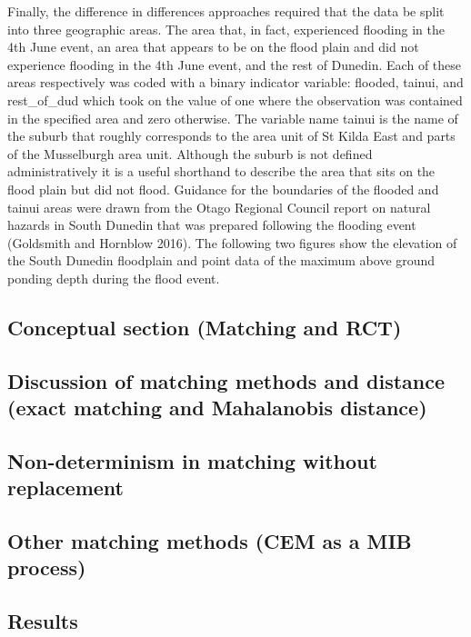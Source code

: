 \documentclass[]{article}
\begin{document}
Finally, the difference in differences approaches required that the data
be split into three geographic areas. The area that, in fact,
experienced flooding in the 4th June event, an area that appears to be
on the flood plain and did not experience flooding in the 4th June
event, and the rest of Dunedin. Each of these areas respectively was
coded with a binary indicator variable: flooded, tainui, and
rest\_of\_dud which took on the value of one where the observation was
contained in the specified area and zero otherwise. The variable name
tainui is the name of the suburb that roughly corresponds to the area
unit of St Kilda East and parts of the Musselburgh area unit. Although
the suburb is not defined administratively it is a useful shorthand to
describe the area that sits on the flood plain but did not flood.
Guidance for the boundaries of the flooded and tainui areas were drawn
from the Otago Regional Council report on natural hazards in South
Dunedin that was prepared following the flooding event (Goldsmith and
Hornblow 2016). The following two figures show the elevation of the
South Dunedin floodplain and point data of the maximum above ground
ponding depth during the flood event.

\subsection{Conceptual section (Matching and
RCT)}\label{conceptual-section-matching-and-rct}

\subsection{Discussion of matching methods and distance (exact matching
and Mahalanobis
distance)}\label{discussion-of-matching-methods-and-distance-exact-matching-and-mahalanobis-distance}

\subsection{Non-determinism in matching without
replacement}\label{non-determinism-in-matching-without-replacement}

\subsection{Other matching methods (CEM as a MIB
process)}\label{other-matching-methods-cem-as-a-mib-process}

\subsection{Results}\label{results}
\end{document}
